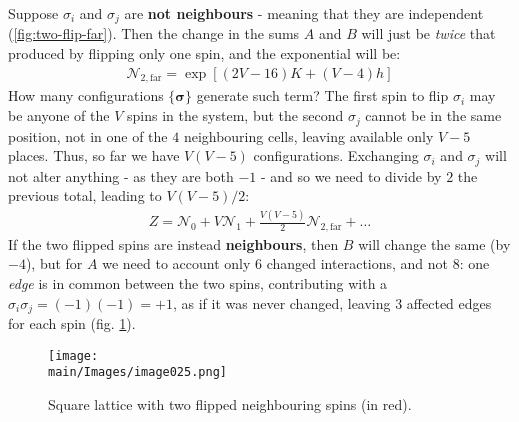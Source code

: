 \documentclass[../../main.tex]{subfiles}
\begin{document}
Suppose $\sigma_i$ and $\sigma_j$ are \textbf{not neighbours}  - meaning that they are independent (\ref{fig:two-flip-far}). Then the change in the sums $A$ and $B$ will just be \textit{twice} that produced by flipping only one spin, and the exponential will be:
\begin{align}
    \mathcal{N}_{2,\mathrm{far}} = \exp\left[(2V -16)K + (V-4)h\right]
\end{align}
How many configurations $\{\bm{\sigma}\}$ generate such term? The first spin to flip $\sigma_i$ may be anyone of the $V$ spins in the system, but the second $\sigma_j$ cannot be in the same position, not in one of the $4$ neighbouring cells, leaving available only $V-5$ places. Thus, so far we have $V(V-5)$ configurations. Exchanging $\sigma_i$ and $\sigma_j$ will not alter anything - as they are both $-1$ - and so we need to divide by $2$ the previous total, leading to $V(V-5)/2$:
\begin{align*}
    Z = \mathcal{N}_0 + V \mathcal{N}_1 + \frac{V(V-5)}{2} \mathcal{N}_{2,\mathrm{far}} + \dots
\end{align*}
If the two flipped spins are instead \textbf{neighbours}, then $B$ will change the same (by $-4$), but for $A$ we need to account only $6$ changed interactions, and not $8$: one \textit{edge} is in common between the two spins, contributing with a $\sigma_i \sigma_j = (-1)(-1) = +1$, as if it was never changed, leaving $3$ affected edges for each spin (fig. \ref{fig:two-flip-close}).

\begin{figure}[H]
    \centering
    \texttt{[image: \\main/Images/image025.png]}
    \caption{Square lattice with two flipped neighbouring spins (in red).\label{fig:two-flip-close}}
\end{figure}
\end{document}
